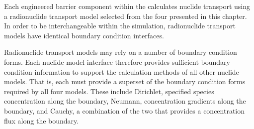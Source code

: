 Each engineered barrier component within the \Cyder calculates 
nuclide transport using a radionuclide transport model selected from the four presented in this 
chapter. In order to be interchangeable within the simulation, radionuclide 
transport models have identical boundary condition interfaces. 

Radionuclide transport models may rely on a number of boundary condition forms.  
Each nuclide model interface therefore provides sufficient boundary condition 
information to support the calculation methods of all other nuclide models. That 
is, each must provide a superset of the boundary condition forms required by all 
four models. These include Dirichlet, specified species concentration along the 
boundary, Neumann, concentration gradients along the boundary, and Cauchy, a 
combination of the two that provides a concentration flux along the boundary.
